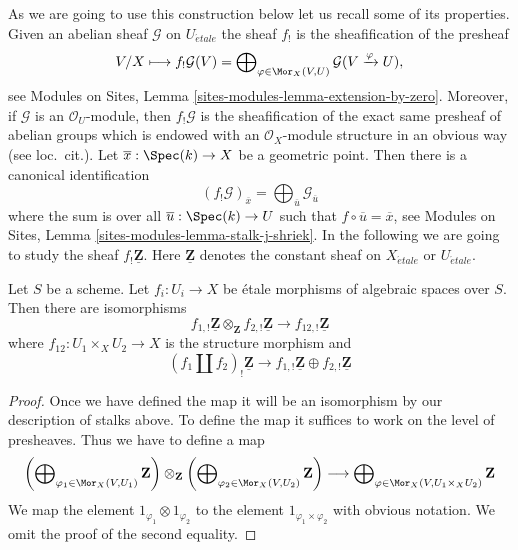 \medskip\noindent
As we are going to use this construction below let us recall some of its
properties. Given an abelian sheaf $\mathcal{G}$ on $U_{\acute{e}tale}$
the sheaf $f_!$ is the sheafification of the presheaf
$$
V/X \longmapsto
f_!\mathcal{G}(V) =
\bigoplus\nolimits_{\varphi \in \Mor_X(V, U)}
\mathcal{G}(V \xrightarrow{\varphi} U),
$$
see
Modules on Sites, Lemma \ref{sites-modules-lemma-extension-by-zero}.
Moreover, if $\mathcal{G}$ is an $\mathcal{O}_U$-module, then $f_!\mathcal{G}$
is the sheafification of the exact same presheaf of abelian groups which
is endowed with an $\mathcal{O}_X$-module structure in an obvious way
(see loc.\ cit.). Let $\overline{x} : \Spec(k) \to X$
be a geometric point. Then there is a canonical identification
$$
(f_!\mathcal{G})_{\overline{x}} =
\bigoplus\nolimits_{\overline{u}} \mathcal{G}_{\overline{u}}
$$
where the sum is over all $\overline{u} : \Spec(k) \to U$ such that
$f \circ \overline{u} = \overline{x}$, see
Modules on Sites, Lemma \ref{sites-modules-lemma-stalk-j-shriek}.
In the following we are going to study the sheaf $f_!\underline{\mathbf{Z}}$.
Here $\underline{\mathbf{Z}}$ denotes the constant sheaf on
$X_{\acute{e}tale}$ or $U_{\acute{e}tale}$.

\begin{lemma}
\label{lemma-product-is-tensor-product}
Let $S$ be a scheme. Let $f_i : U_i \to X$ be \'etale morphisms
of algebraic spaces over $S$. Then there are isomorphisms
$$
f_{1, !}\underline{\mathbf{Z}} \otimes_{\mathbf{Z}}
f_{2, !}\underline{\mathbf{Z}}
\longrightarrow
f_{12, !}\underline{\mathbf{Z}}
$$
where $f_{12} : U_1 \times_X U_2 \to X$ is the structure morphism
and
$$
(f_1 \amalg f_2)_! \underline{\mathbf{Z}}
\longrightarrow
f_{1, !}\underline{\mathbf{Z}} \oplus
f_{2, !}\underline{\mathbf{Z}}
$$
\end{lemma}

\begin{proof}
Once we have defined the map it will be an isomorphism by our description
of stalks above. To define the map it suffices to work on the level of
presheaves. Thus we have to define a map
$$
\left(\bigoplus\nolimits_{\varphi_1 \in \Mor_X(V, U_1)} \mathbf{Z}\right)
\otimes_{\mathbf{Z}}
\left(\bigoplus\nolimits_{\varphi_2 \in \Mor_X(V, U_2)} \mathbf{Z}\right)
\longrightarrow
\bigoplus\nolimits_{\varphi \in \Mor_X(V, U_1 \times_X U_2)}
\mathbf{Z}
$$
We map the element $1_{\varphi_1} \otimes 1_{\varphi_2}$ to the element
$1_{\varphi_1 \times \varphi_2}$ with obvious notation. We omit the proof
of the second equality.
\end{proof}

